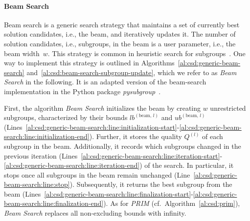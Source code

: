 \documentclass{article}
\theoremstyle{definition}
\begin{document}
\paragraph{Beam Search}

Beam search is a generic search strategy that maintains a set of currently best solution candidates, i.e., the beam, and iteratively updates it.
The number of solution candidates, i.e., subgroups, in the beam is a user parameter, i.e., the beam width~$w$.
This strategy is common in heuristic search for subgroups~\cite{atzmueller2005exploiting}.
One way to implement this strategy is outlined in Algorithms~\ref{al:csd:generic-beam-search} and~\ref{al:csd:beam-search-subgroup-update}, which we refer to as \emph{Beam Search} in the following.
It is an adapted version of the beam-search implementation in the Python package \emph{pysubgroup}~\cite{lemmerich2019pysubgroup}.

First, the algorithm \emph{Beam Search} initializes the beam by creating $w$ unrestricted subgroups, characterized by their bounds $\mathit{lb}^{(\text{beam, } l)}$ and $\mathit{ub}^{(\text{beam, } l)}$ (Lines~\ref{al:csd:generic-beam-search:line:initialization-start}-\ref{al:csd:generic-beam-search:line:initialization-end}).
Further, it stores the quality $Q^{(l)}$ of each subgroup in the beam.
Additionally, it records which subgroups changed in the previous iteration (Lines~\ref{al:csd:generic-beam-search:line:iteration-start}-\ref{al:csd:generic-beam-search:line:iteration-end}) of the search.
In particular, it stops once all subgroups in the beam remain unchanged (Line~\ref{al:csd:generic-beam-search:line:stop}).
Subsequently, it returns the best subgroup from the beam (Lines~\ref{al:csd:generic-beam-search:line:finalization-start}-\ref{al:csd:generic-beam-search:line:finalization-end}).
As for \emph{PRIM} (cf.~Algorithm~\ref{al:csd:prim}), \emph{Beam Search} replaces all non-excluding bounds with infinity.
\end{document}
